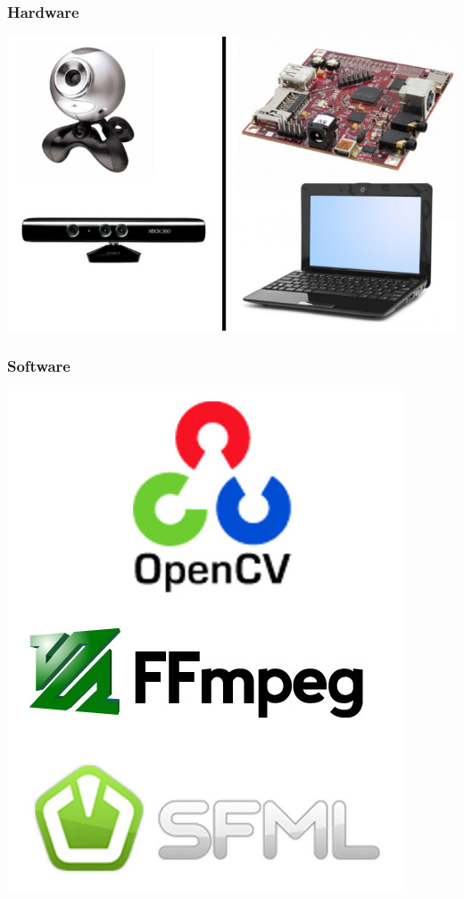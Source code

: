 \documentclass{beamer}
\begin{document}
\begin{frame}
\frametitle{Hardware}
\includegraphics[scale=0.4]{requirements_hardware.jpg}
\end{frame}
\begin{frame}
\frametitle{Software}
\begin{center}
\includegraphics[scale=0.3]{requirements_libs.jpg}
\end{center}
\end{frame}
\end{document}

